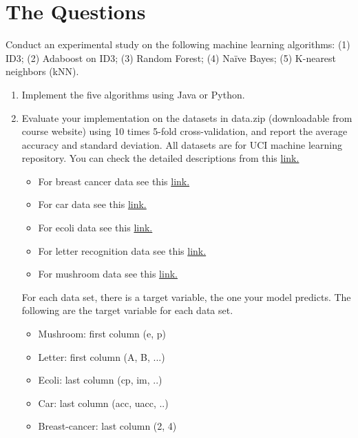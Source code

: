\documentclass[12pt]{article}
\begin{document}
\section*{The Questions}
{\small
Conduct an experimental study on the following machine learning algorithms: (1) ID3; (2) Adaboost on ID3; (3) Random Forest; (4) Naïve Bayes; (5) K-nearest neighbors (kNN).


\begin{enumerate}
\item Implement the five algorithms using Java or Python.
\item Evaluate your implementation on the datasets in data.zip (downloadable from course website) using 10 times 5-fold cross-validation, and report the average accuracy and standard deviation. All datasets are for UCI machine learning repository. You can check the detailed descriptions from this 
\href{http://www.ics.uci.edu/~mlearn/MLRepository.html}{ link.}

\begin{itemize}
    \item For breast cancer data see this \href{http://archive.ics.uci.edu/ml/datasets/Breast+Cancer+Wisconsin+\%28Diagnostic\%29}{ link.}
    \item For car data see this \href{http://archive.ics.uci.edu/ml/datasets/Car+Evaluation}{ link.} 
    \item For ecoli data see this \href{http://archive.ics.uci.edu/ml/datasets/Ecoli}{ link.}
    \item For letter recognition data see this \href{http://archive.ics.uci.edu/ml/datasets/Letter+Recognition}{ link.}
    \item For mushroom data see this \href{http://archive.ics.uci.edu/ml/datasets/Mushroom}{ link.} 
\end{itemize}

For each data set, there is a target variable, the one your model predicts. The following are the target variable for each data set.

\begin{itemize}
    \item Mushroom: first column (e, p)
    \item Letter: first column (A, B, ...)
    \item Ecoli: last column (cp, im, ..)
    \item Car: last column (acc, uacc, ..)
    \item Breast-cancer: last column (2, 4)
\end{itemize}


\end{enumerate}}
\end{document}
